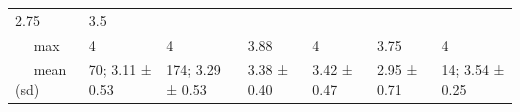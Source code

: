 \documentclass[
  english,
  man,floatsintext]{apa6}
\begin{document}
\begin{longtable}[]{@{}lllllll@{}}
\begin{minipage}[t]{0.10\columnwidth}
2.75\strut
\end{minipage} & \begin{minipage}[t]{0.11\columnwidth}\raggedright
3.5\strut
\end{minipage}\tabularnewline
\begin{minipage}[t]{0.14\columnwidth}\raggedright
~~ max\strut
\end{minipage} & \begin{minipage}[t]{0.11\columnwidth}\raggedright
4\strut
\end{minipage} & \begin{minipage}[t]{0.12\columnwidth}\raggedright
4\strut
\end{minipage} & \begin{minipage}[t]{0.10\columnwidth}\raggedright
3.88\strut
\end{minipage} & \begin{minipage}[t]{0.12\columnwidth}\raggedright
4\strut
\end{minipage} & \begin{minipage}[t]{0.10\columnwidth}\raggedright
3.75\strut
\end{minipage} & \begin{minipage}[t]{0.11\columnwidth}\raggedright
4\strut
\end{minipage}\tabularnewline
\begin{minipage}[t]{0.14\columnwidth}\raggedright
~~ mean (sd)\strut
\end{minipage} & \begin{minipage}[t]{0.11\columnwidth}\raggedright
70; 3.11 ± 0.53\strut
\end{minipage} & \begin{minipage}[t]{0.12\columnwidth}\raggedright
174; 3.29 ± 0.53\strut
\end{minipage} & \begin{minipage}[t]{0.10\columnwidth}\raggedright
3.38 ± 0.40\strut
\end{minipage} & \begin{minipage}[t]{0.12\columnwidth}\raggedright
3.42 ± 0.47\strut
\end{minipage} & \begin{minipage}[t]{0.10\columnwidth}\raggedright
2.95 ± 0.71\strut
\end{minipage} & \begin{minipage}[t]{0.11\columnwidth}\raggedright
14; 3.54 ± 0.25\strut
\end{minipage}\tabularnewline
\bottomrule
\end{longtable}
\end{document}
